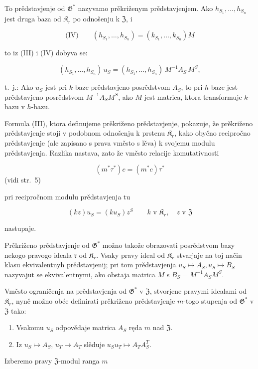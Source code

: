 \documentclass[11pt]{article}
\begin{document}
To prědstavjenje od \(\mathfrak{G}^*\) nazyvamo prěkriženym prědstavjenjem. Ako \(h_{S_1}, \ldots, h_{S_n}\) jest druga baza od \(\mathfrak{K}_r\) po odnošenju k \(\mathfrak{Z}\), i

\[
\text{(IV)}\qquad (h_{S_1}, \ldots, h_{S_n}) = (k_{S_1}, \ldots, k_{S_n})M
\]

to iz (III) i (IV) dobyva se:

\[(h_{S_1},\ldots,h_{S_n})\,u_S=(h_{S_1},\ldots,h_{S_n})\,M^{-1}A_S\,M^S,\]

t.~j.: Ako \(u_S\) jest pri \(k\)-baze prědstavjeno posrědstvom \(A_S\), to pri \(h\)-baze jest prědstavjeno posrědstvom \(M^{-1}A_SM^S\), ako \(M\) jest matrica, ktora transformuje \(k\)-bazu v \(h\)-bazu.

Formula (III), ktora definujeme prěkriženo prědstavjenje, pokazuje, že prěkriženo prědstavjenje stoji v podobnom odnošenju k prstenu \(\mathfrak K_r\), kako obyčno recipročno prědstavjenje (ale zapisano s prava vměsto s lěva) k svojemu modulu prědstavjenja. Razlika nastava, zato že vměsto relacije komutativnosti

\[(m^*\tau^*)c = (m^*c)\tau^*\]
(vidi str.~5)

pri recipročnom modulu prědstavjenja tu

\[
(kz)u_S=(ku_S)z^S\qquad k\text{ v }\mathfrak K_r,\quad z\text{ v }\mathfrak Z
\]

nastupaje.

Prěkriženo prědstavjenje od \(\mathfrak{G}^*\) možno takože obrazovati posrědstvom bazy nekogo pravogo ideala \(\mathfrak r\) od \(\mathfrak{K}_r\). Vsaky pravy ideal od \(\mathfrak{K}_r\) stvarjaje na toj način klasu ekvivalentnyh prědstavjenij; pri tom prědstavjenja \(u_S \mapsto A_S, u_S \mapsto B_S\) nazyvajut se ekvivalentnymi, ako obstaja matrica \(M\) s \(B_S = M^{-1}A_SM^S\).

Vměsto ograničenja na prědstavjenja od \(\mathfrak G^*\) v \(\mathfrak Z\), stvorjene pravymi idealami od \(\mathfrak K_r\), nyně možno obće definirati prěkriženo prědstavjenje \(m\)-togo stupenja od \(\mathfrak G^*\) v \(\mathfrak Z\) tako:

\begin{enumerate}
\item Vsakomu \(u_S\) odpovědaje matrica \(A_S\) ręda \(m\) nad \(\mathfrak Z\).
\item Iz \(u_S \mapsto A_S\), \(u_T \mapsto A_T\) slěduje \(u_Su_T \mapsto A_TA_S^T\).
\end{enumerate}

Izberemo pravy \(\mathfrak Z\)-modul ranga \(m\)
\end{document}
